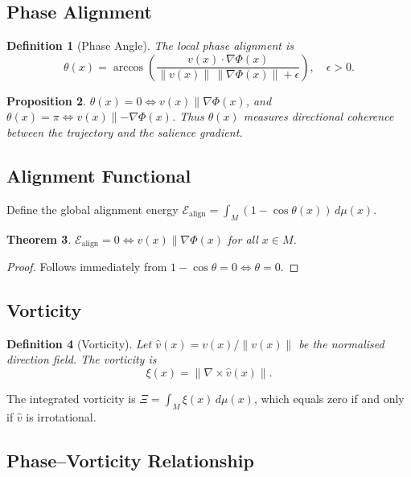 \documentclass[12pt, a4paper]{article}
\newtheorem{theorem}{Theorem}[section]
\newtheorem{definition}[theorem]{Definition}
\newtheorem{proposition}[theorem]{Proposition}
\theoremstyle{remark}
\theoremstyle{definition}
\begin{document}
\subsection{Phase Alignment}

\begin{definition}[Phase Angle]
The local phase alignment is
\[
\theta(x)
= \arccos\!\left(
\frac{v(x)\cdot\nabla\Phi(x)}
{\|v(x)\|\,\|\nabla\Phi(x)\|+\epsilon}
\right), \quad \epsilon > 0.
\]
\end{definition}

\begin{proposition}
$\theta(x) = 0 \iff v(x) \parallel \nabla\Phi(x)$, and
$\theta(x) = \pi \iff v(x) \parallel -\nabla\Phi(x)$.
Thus $\theta(x)$ measures directional coherence between the trajectory and the salience
gradient.
\end{proposition}

\subsection{Alignment Functional}

Define the global alignment energy
$\mathcal{E}_{\mathrm{align}} = \int_M (1 - \cos\theta(x))\,d\mu(x)$.

\begin{theorem}
$\mathcal{E}_{\mathrm{align}} = 0 \iff v(x) \parallel \nabla\Phi(x)$ for all $x \in M$.
\end{theorem}

\begin{proof}
Follows immediately from $1 - \cos\theta = 0 \iff \theta = 0$.
\end{proof}

\subsection{Vorticity}

\begin{definition}[Vorticity]
Let $\hat{v}(x) = v(x)/\|v(x)\|$ be the normalised direction field.  The vorticity is
\[
\xi(x) = \|\nabla \times \hat{v}(x)\|.
\]
\end{definition}

The integrated vorticity is $\Xi = \int_M \xi(x)\,d\mu(x)$, which equals zero if and only
if $\hat{v}$ is irrotational.

\subsection{Phase--Vorticity Relationship}
\end{document}
